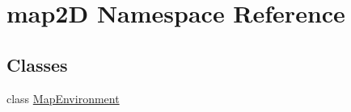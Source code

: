 \hypertarget{namespacemap2D}{}\section{map2D Namespace Reference}
\label{namespacemap2D}
\subsection*{Classes}
\begin{DoxyCompactItemize}
\item 
class \hyperlink{classmap2D_1_1MapEnvironment}{Map\+Environment}
\end{DoxyCompactItemize}
